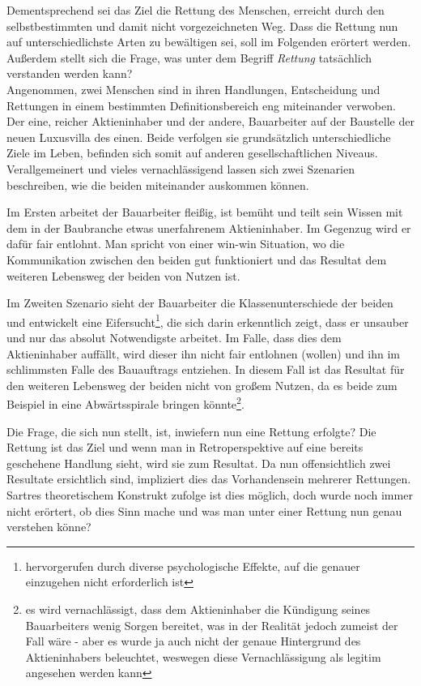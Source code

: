 \documentclass[12pt,a4paper,oneside]{article}
\begin{document}
  Dementsprechend sei das Ziel die Rettung des Menschen, erreicht durch den selbstbestimmten und damit nicht vorgezeichneten Weg. Dass die Rettung nun auf unterschiedlichste Arten zu bewältigen sei, soll im Folgenden erörtert werden. Außerdem stellt sich die Frage, was unter dem Begriff \textit{Rettung} tatsächlich verstanden werden kann? \\
  
  Angenommen, zwei Menschen sind in ihren Handlungen, Entscheidung und Rettungen in einem bestimmten Definitionsbereich eng miteinander verwoben. Der eine, reicher Aktieninhaber und der andere, Bauarbeiter auf der Baustelle der neuen Luxusvilla des einen. Beide verfolgen sie grundsätzlich unterschiedliche Ziele im Leben, befinden sich somit auf anderen gesellschaftlichen Niveaus. Verallgemeinert und vieles vernachlässigend lassen sich zwei Szenarien beschreiben, wie die beiden miteinander auskommen können. 
  
  Im Ersten arbeitet der Bauarbeiter fleißig, ist bemüht und teilt sein Wissen mit dem in der Baubranche etwas unerfahrenem Aktieninhaber. Im Gegenzug wird er dafür fair entlohnt. Man spricht von einer win-win Situation, wo die Kommunikation zwischen den beiden gut funktioniert und das Resultat dem weiteren Lebensweg der beiden von Nutzen ist. 
  
  Im Zweiten Szenario sieht der Bauarbeiter die Klassenunterschiede der beiden und entwickelt eine Eifersucht\footnote{hervorgerufen durch diverse psychologische Effekte, auf die genauer einzugehen nicht erforderlich ist}, die sich darin erkenntlich zeigt, dass er unsauber und nur das absolut Notwendigste arbeitet. Im Falle, dass dies dem Aktieninhaber auffällt, wird dieser ihn nicht fair entlohnen (wollen) und ihn im schlimmsten Falle des Bauauftrags entziehen. In diesem Fall ist das Resultat für den weiteren Lebensweg der beiden nicht von großem Nutzen, da es beide zum Beispiel in eine Abwärtsspirale bringen könnte\footnote{es wird vernachlässigt, dass dem Aktieninhaber die Kündigung seines Bauarbeiters wenig Sorgen bereitet, was in der Realität jedoch zumeist der Fall wäre - aber es wurde ja auch nicht der genaue Hintergrund des Aktieninhabers beleuchtet, weswegen diese Vernachlässigung als legitim angesehen werden kann}.
  
  Die Frage, die sich nun stellt, ist, inwiefern nun eine Rettung erfolgte? Die Rettung ist das Ziel und wenn man in Retroperspektive auf eine bereits geschehene Handlung sieht, wird sie zum Resultat. Da nun offensichtlich zwei Resultate ersichtlich sind, impliziert dies das Vorhandensein mehrerer Rettungen. Sartres theoretischem Konstrukt zufolge ist dies möglich, doch wurde noch immer nicht erörtert, ob dies Sinn mache und was man unter einer Rettung nun genau verstehen könne? \\
  
\end{document}
